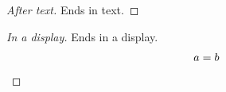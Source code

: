 \documentclass{article}
\begin{document}
\begin{proof}[After text]
Ends in text.
\end{proof}
\begin{proof}[In a display]
Ends in a display.
\[ a = b \qedhere \]
\end{proof}
\end{document}
